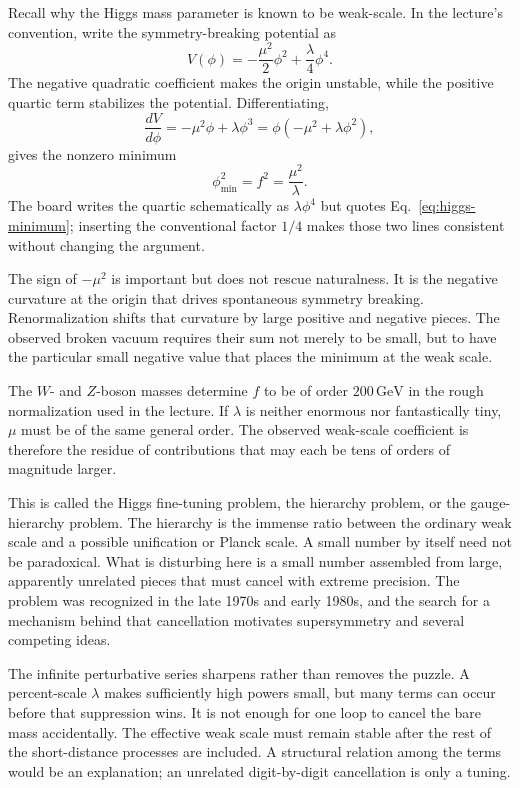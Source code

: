 Recall why the Higgs mass parameter is known to be weak-scale. In the
lecture's convention, write the symmetry-breaking potential as
\begin{equation}
V(\phi)=-\frac{\mu^2}{2}\phi^2+\frac{\lambda}{4}\phi^4.
\label{eq:higgs-potential}
\end{equation}
The negative quadratic coefficient makes the origin unstable, while the
positive quartic term stabilizes the potential. Differentiating,
\begin{equation}
\frac{dV}{d\phi}=-\mu^2\phi+\lambda\phi^3
=\phi(-\mu^2+\lambda\phi^2),
\end{equation}
gives the nonzero minimum
\begin{equation}
\phi_{\min}^2=f^2=\frac{\mu^2}{\lambda}.
\label{eq:higgs-minimum}
\end{equation}
The board writes the quartic schematically as \(\lambda\phi^4\) but quotes
Eq.~\eqref{eq:higgs-minimum}; inserting the conventional factor \(1/4\)
makes those two lines consistent without changing the argument.

The sign of \(-\mu^2\) is important but does not rescue naturalness. It is the
negative curvature at the origin that drives spontaneous symmetry breaking.
Renormalization shifts that curvature by large positive and negative pieces.
The observed broken vacuum requires their sum not merely to be small, but to
have the particular small negative value that places the minimum at the weak
scale.

The \(W\)- and \(Z\)-boson masses determine \(f\) to be of order
\(200\,\mathrm{GeV}\) in the rough normalization used in the lecture. If
\(\lambda\) is neither enormous nor fantastically tiny, \(\mu\) must be of
the same general order. The observed weak-scale coefficient is therefore the
residue of contributions that may each be tens of orders of magnitude
larger.

This is called the Higgs fine-tuning problem, the hierarchy problem, or the
gauge-hierarchy problem. The hierarchy is the immense ratio between the
ordinary weak scale and a possible unification or Planck scale. A small
number by itself need not be paradoxical. What is disturbing here is a small
number assembled from large, apparently unrelated pieces that must cancel
with extreme precision. The problem was recognized in the late 1970s and
early 1980s, and the search for a mechanism behind that cancellation
motivates supersymmetry and several competing ideas.

The infinite perturbative series sharpens rather than removes the puzzle. A
percent-scale \(\lambda\) makes sufficiently high powers small, but many terms
can occur before that suppression wins. It is not enough for one loop to
cancel the bare mass accidentally. The effective weak scale must remain
stable after the rest of the short-distance processes are included. A
structural relation among the terms would be an explanation; an unrelated
digit-by-digit cancellation is only a tuning.

